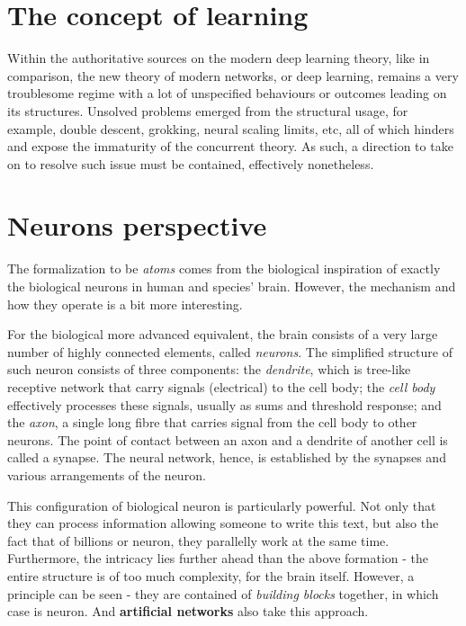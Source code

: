 \section{The concept of learning}

Within the authoritative sources on the modern deep learning theory, like \cite{neyshabur2015norm,neyshabur2017exploring,NJacot:2018:NTK,arora2019finegrained,lee2019wide,chizat2019lazy,zou2019implicit,bartlett2021deep,roberts2022principles,wei2022theory,yang2019scaling} in comparison, the new theory of modern networks, or deep learning, remains a very troublesome regime with a lot of unspecified behaviours or outcomes leading on its structures. Unsolved problems emerged from the structural usage, for example, double descent, grokking, neural scaling limits, etc, all of which hinders and expose the immaturity of the concurrent theory. As such, a direction to take on to resolve such issue must be contained, effectively nonetheless. 

\section{Neurons perspective}

The formalization to be \textit{atoms} comes from the biological inspiration of exactly the biological neurons in human and species' brain. However, the mechanism and how they operate is a bit more interesting. 

For the biological more advanced equivalent, the brain consists of a very large number of highly connected elements, called \textit{neurons}. The simplified structure of such neuron consists of three components: the \textit{dendrite}, which is tree-like receptive network that carry signals (electrical) to the cell body; the \textit{cell body} effectively processes these signals, usually as sums and threshold response; and the \textit{axon}, a single long fibre that carries signal from the cell body to other neurons. The point of contact between an axon and a dendrite of another cell is called a synapse. The neural network, hence, is established by the synapses and various arrangements of the neuron. 

This configuration of biological neuron is particularly powerful. Not only that they can process information allowing someone to write this text, but also the fact that of billions or neuron, they parallelly work at the same time. Furthermore, the intricacy lies further ahead than the above formation - the entire structure is of too much complexity, for the brain itself. However, a principle can be seen - they are contained of \textit{building blocks} together, in which case is neuron. And \textbf{artificial networks} also take this approach. 

